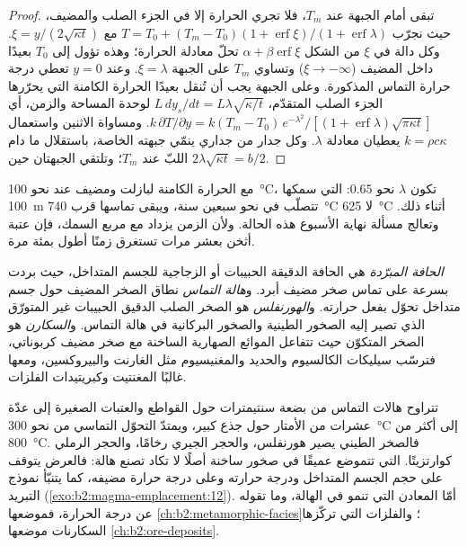 \begin{proof}
تبقى  أمام الجبهة عند $T_m$، فلا تجري الحرارة إلا في الجزء الصلب
والمضيف، حيث نجرّب $T = T_0 + (T_m - T_0)(1 + \operatorname{erf}\xi)/(1 +
\operatorname{erf}\lambda)$ مع $\xi = y/(2\sqrt{\kappa t})$. وكل دالة في $\xi$
من الشكل $\alpha + \beta\operatorname{erf}\xi$ تحلّ معادلة الحرارة؛ وهذه
تؤول إلى $T_0$ بعيدًا داخل المضيف ($\xi \to -\infty$) وتساوي $T_m$ على الجبهة
$\xi = \lambda$. وعند $y = 0$ تعطي درجة حرارة التماس المذكورة. وعلى الجبهة
يجب أن تُنقل بعيدًا الحرارة الكامنة التي يحرّرها الجزء الصلب المتقدّم، $L\,dy_s/dt = L\lambda\sqrt{\kappa/t}$
لوحدة المساحة والزمن، أي $k\,\partial T/\partial y = k(T_m -
T_0)\,e^{-\lambda^2}/[(1 + \operatorname{erf}\lambda)\sqrt{\pi\kappa t}]$. ومساواة
الاثنين واستعمال $k = \rho c\kappa$ يعطيان معادلة $\lambda$. وكل جدار من جداري
 ينمّي جبهته الخاصة، باستقلال ما دام اللبّ عند $T_m$؛ وتلتقي
الجبهتان حين $2\lambda\sqrt{\kappa t} = b/2$.
\end{proof}

مع الحرارة الكامنة لبازلت ومضيف عند نحو \qty{100}{\celsius}، تكون
$\lambda$ نحو $0.65$:  التي سمكها \qty{100}{m} تتصلّب في نحو
سبعين سنة، ويبقى تماسها قرب \qty{740}{\celsius} لا
\qty{625}{\celsius} أثناء ذلك. وتعالج مسألة نهاية الأسبوع هذه الحالة.
ولأن الزمن يزداد مع مربع السمك، فإن عتبة أثخن بعشر مرات
تستغرق زمنًا أطول بمئة مرة.

\begin{definition}\label{def:b2:magma-emplacement:aureole}
\emph{الحافة المبرّدة} هي الحافة الدقيقة الحبيبات أو الزجاجية
للجسم المتداخل، حيث بردت  بسرعة على تماس صخر مضيف أبرد.
و\emph{هالة التماس} نطاق الصخر المضيف حول
جسم متداخل تحوّل بفعل حرارته. و\emph{الهورنفلس} هو
الصخر الصلب الدقيق الحبيبات غير المتورّق الذي تصير إليه الصخور الطينية والصخور البركانية في
هالة التماس. و\emph{السكارن} هو الصخر المتكوّن حيث تتفاعل الموائع
الصهارية الساخنة مع صخر مضيف كربوناتي، فترسّب سيليكات الكالسيوم والحديد والمغنيسيوم
مثل الغارنت والبيروكسين، ومعها غالبًا المغنتيت وكبريتيدات الفلزات.
\end{definition}

تتراوح هالات التماس من بضعة سنتيمترات حول القواطع والعتبات الصغيرة إلى
عدّة عشرات من الأمتار حول جذع كبير، ويمتدّ التحوّل التماسي
من نحو \qty{300}{\celsius} إلى أكثر من \qty{800}{\celsius}. فالصخر الطيني يصير
هورنفلس، والحجر الجيري رخامًا، والحجر الرملي كوارتزيتًا.  التي تتموضع عميقًا
في صخور ساخنة أصلًا لا تكاد تصنع هالة: فالعرض يتوقف على
حجم الجسم المتداخل ودرجة حرارته وعلى درجة حرارة مضيفه، كما
يتنبّأ نموذج التبريد (\cref{exo:b2:magma-emplacement:12}). أمّا المعادن التي تنمو في الهالة،
وما تقوله عن درجة الحرارة، فموضعها \cref{ch:b2:metamorphic-facies}؛
والفلزات التي تركّزها السكارنات موضعها \cref{ch:b2:ore-deposits}.

